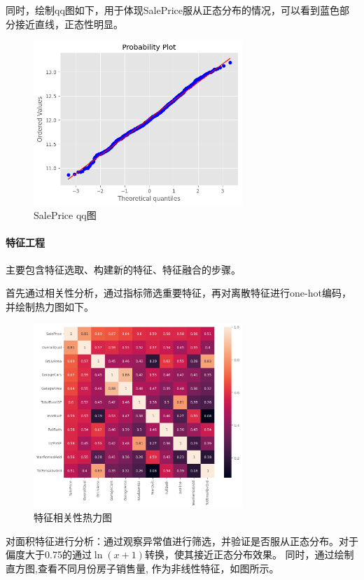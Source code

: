 \documentclass[12pt]{ctexart}
\begin{document}
同时，绘制qq图如下，用于体现SalePrice服从正态分布的情况，可以看到蓝色部分接近直线，正态性明显。

\begin{figure}[H]
    \centering
    \includegraphics[width=0.7\textwidth]{image/output4-3.png}
    \caption{SalePrice qq图}
\end{figure}

\paragraph{特征工程}

主要包含特征选取、构建新的特征、特征融合的步骤。

首先通过相关性分析，通过指标筛选重要特征，再对离散特征进行one-hot编码，并绘制热力图如下。

\begin{figure}[H]
    \centering
    \includegraphics[width=0.7\textwidth]{image/output4-4.png}
    \caption{特征相关性热力图}
\end{figure}

对面积特征进行分析：通过观察异常值进行筛选，并验证是否服从正态分布。对于偏度大于0.75的通过$\ln(x+1)$转换，使其接近正态分布效果。
同时，通过绘制直方图,查看不同月份房子销售量, 作为非线性特征，如图所示。
\end{document}
